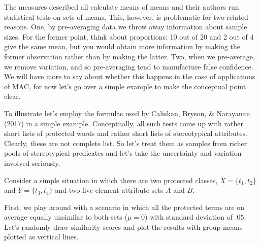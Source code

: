 \documentclass[
  10pt,
  dvipsnames,enabledeprecatedfontcommands]{scrartcl}
\begin{document}
The measures described all calculate means of means and their authors
run statistical tests on sets of means. This, however, is problematic
for two related reasons. One, by pre-averaging data we throw away
information about sample sizes. For the former point, think about
proportions: 10 out of 20 and 2 out of 4 give the same mean, but you
would obtain more information by making the former observation rather
than by making the latter. Two, when we pre-average, we remove
variation, and so pre-averaging tend to manufacture false confidence. We
will have more to say about whether this happens in the case of
applications of MAC, for now let's go over a simple example to make the
conceptual point clear.

To illustrate let's employ the formulas used by Caliskan, Bryson, \&
Narayanan (2017) in a simple example. Conceptually, all such tests come
up with rather short lists of protected words and rather short lists of
stereotypical attributes. Clearly, these are not complete list. So let's
treat them as samples from richer pools of stereotypical predicates and
let's take the uncertainty and variation involved seriously.

Consider a simple situation in which there are two protected classes,
\(X=\{t_1,t_2\}\) and \(Y=\{t_3,t_4\}\) and two five-element attribute
sets \(A\) and \(B\).

First, we play around with a scenario in which all the protected terms
are on average equally unsimilar to both sets (\(\mu =0\)) with standard
deviation of \(.05\). Let's randomly draw similarity scores and plot the
results with group means plotted as vertical lines.

\footnotesize
\end{document}

